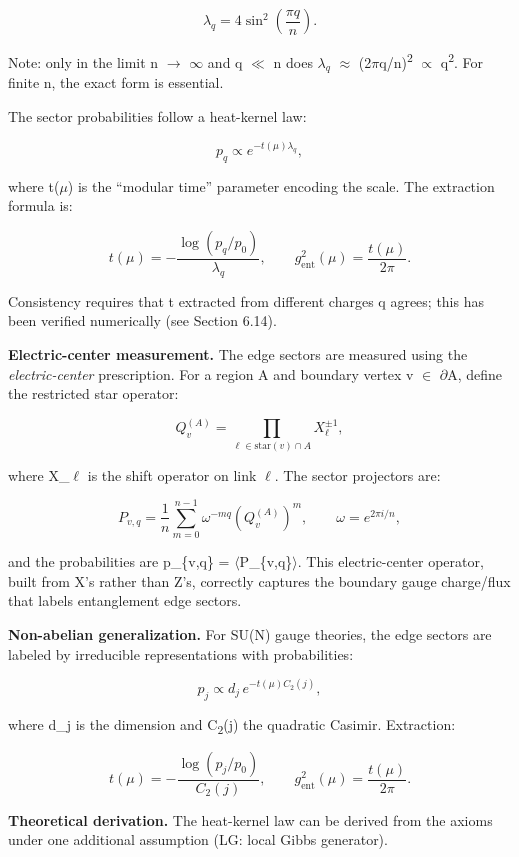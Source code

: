 \documentclass[11pt,a4paper]{article}
\theoremstyle{remark}
\begin{document}
\[
\lambda_q = 4 \sin^2\left(\frac{\pi q}{n}\right).
\]

Note: only in the limit n \ensuremath{\to} \ensuremath{\infty} and q \ensuremath{\ll} n does $\lambda_q$ \ensuremath{\approx}
(2\ensuremath{\pi}q/n)\textsuperscript{2} \ensuremath{\propto} q\textsuperscript{2}. For finite n, the exact form is essential.

The sector probabilities follow a heat-kernel law:

\[
p_q \propto e^{-t(\mu) \lambda_q},
\]

where t(\ensuremath{\mu}) is the ``modular time'' parameter encoding the scale. The
extraction formula is:

\[
t(\mu) = -\frac{\log(p_q/p_0)}{\lambda_q}, \qquad
g_{\mathrm{ent}}^2(\mu) = \frac{t(\mu)}{2\pi}.
\]

Consistency requires that t extracted from different charges q agrees;
this has been verified numerically (see Section 6.14).

\textbf{Electric-center measurement.} The edge sectors are measured using the
\emph{electric-center} prescription. For a region A and boundary vertex
v \ensuremath{\in} \ensuremath{\partial}A, define the restricted star operator:

\[
Q_v^{(A)} = \prod_{\ell \in \mathrm{star}(v) \cap A} X_\ell^{\pm 1},
\]

where X\_\ensuremath{\ell} is the shift operator on link \ensuremath{\ell}. The sector projectors are:

\[
P_{v,q} = \frac{1}{n} \sum_{m=0}^{n-1} \omega^{-mq} \left(Q_v^{(A)}\right)^m,
\qquad \omega = e^{2\pi i/n},
\]

and the probabilities are p\_\{v,q\} = \ensuremath{\langle}P\_\{v,q\}\ensuremath{\rangle}. This
electric-center operator, built from X's rather than Z's, correctly
captures the boundary gauge charge/flux that labels entanglement edge sectors.

\textbf{Non-abelian generalization.} For SU(N) gauge theories, the edge
sectors are labeled by irreducible representations with probabilities:

\[
p_j \propto d_j \, e^{-t(\mu) C_2(j)},
\]

where d\_j is the dimension and C\textsubscript{2}(j) the quadratic Casimir. Extraction:

\[
t(\mu) = -\frac{\log(p_j/p_0)}{C_2(j)}, \qquad
g_{\mathrm{ent}}^2(\mu) = \frac{t(\mu)}{2\pi}.
\]

\textbf{Theoretical derivation.} The heat-kernel law can be derived from the axioms
under one additional assumption (LG: local Gibbs generator).
\end{document}
